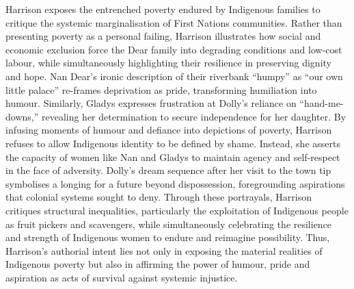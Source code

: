 \documentclass[a4paper]{article}
\begin{document}
Harrison exposes the entrenched poverty endured by Indigenous families to critique the
systemic marginalisation of First Nations communities. Rather than presenting poverty as a
personal failing, Harrison illustrates how social and economic exclusion force the Dear family
into degrading conditions and low-cost labour, while simultaneously highlighting their
resilience in preserving dignity and hope. Nan Dear’s ironic description of their riverbank
“humpy” as “our own little palace” re-frames deprivation as pride, transforming humiliation
into humour. Similarly, Gladys expresses frustration at Dolly’s reliance on “hand-me-downs,”
revealing her determination to secure independence for her daughter. By infusing moments
of humour and defiance into depictions of poverty, Harrison refuses to allow Indigenous
identity to be defined by shame. Instead, she asserts the capacity of women like Nan and
Gladys to maintain agency and self-respect in the face of adversity. Dolly’s dream sequence
after her visit to the town tip symbolises a longing for a future beyond dispossession,
foregrounding aspirations that colonial systems sought to deny. Through these portrayals,
Harrison critiques structural inequalities, particularly the exploitation of Indigenous people as fruit pickers and scavengers, while simultaneously celebrating the resilience and strength of
Indigenous women to endure and reimagine possibility. Thus, Harrison’s authorial intent lies
not only in exposing the material realities of Indigenous poverty but also in affirming the
power of humour, pride and aspiration as acts of survival against systemic injustice.\\
\end{document}
